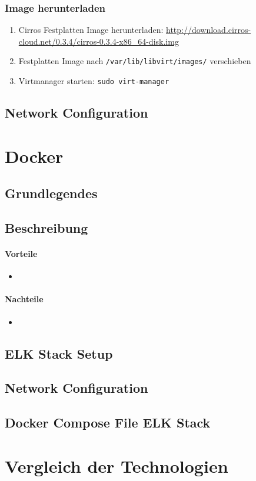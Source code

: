 \subsubsection{Image herunterladen}
\begin{enumerate}
	\item Cirros Festplatten Image herunterladen: \url{http://download.cirros-cloud.net/0.3.4/cirros-0.3.4-x86_64-disk.img}
	\item Festplatten Image nach \lstinline|/var/lib/libvirt/images/| verschieben
	\item Virtmanager starten: \lstinline|sudo virt-manager|
\end{enumerate}

\subsection{Network Configuration}


\section{Docker}
\subsection{Grundlegendes}

\subsection{Beschreibung}
\paragraph{Vorteile}
\begin{itemize}
	\item 
\end{itemize}
\paragraph{Nachteile}
\begin{itemize}
	\item 
\end{itemize}

\subsection{ELK Stack Setup}

\subsection{Network Configuration}

\subsection{Docker Compose File ELK Stack}




\section{Vergleich der Technologien}



